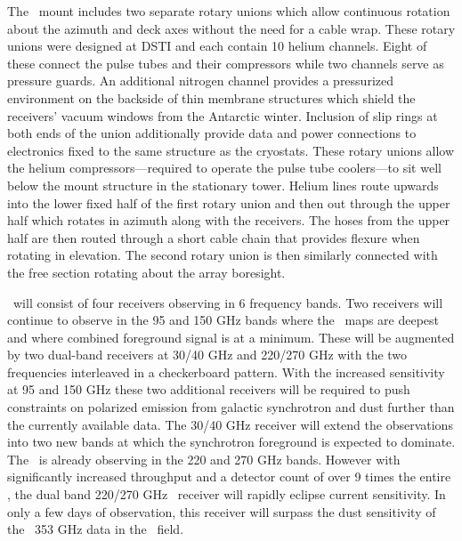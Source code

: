\documentclass[]{spie}  %
\begin{document}
The \biceparray\ mount includes two separate rotary unions which allow
continuous rotation about the azimuth and deck axes without the need for a
cable wrap. These rotary unions were designed at DSTI and each contain 10
helium channels. Eight of these connect the pulse tubes and their compressors
while two channels serve as pressure guards. An additional nitrogen channel
provides a pressurized environment on the backside of thin membrane
structures which shield the receivers' vacuum windows from the Antarctic winter.
Inclusion of slip rings at both ends of the union additionally provide data and power
connections to electronics fixed to the same structure as the cryostats. These rotary
unions allow the helium compressors---required to operate the
pulse tube coolers---to sit well below the mount structure in the
stationary tower. Helium lines route upwards into the lower fixed half of the first
rotary union and then out through the upper half which rotates in azimuth
along with the receivers. The hoses from the upper half are then routed through a
short cable chain that provides flexure when rotating in elevation. The
second rotary union is then similarly connected with the free section rotating
about the array boresight.



\biceparray\ will consist of four receivers observing in 6 frequency bands.
Two receivers will continue to observe in the 95 and 150 GHz bands where the
\bk\ maps are deepest and where combined foreground
signal is at a minimum. These will be augmented by two dual-band receivers at
30/40 GHz and 220/270 GHz with the two frequencies interleaved in a
checkerboard pattern. With the increased sensitivity at 95 and 150 GHz these
two additional receivers will be required to push constraints on polarized
emission from galactic synchrotron and dust further than the currently available data.
The 30/40 GHz receiver will extend the observations into two
new bands at which the synchrotron foreground is expected to dominate. The
\keckarray\ is already observing in the 220 and 270 GHz bands.  However with
significantly increased throughput and a detector count of over 9 times the
entire \keckarray, the dual band 220/270 GHz \biceparray\ receiver will rapidly
eclipse current sensitivity. In only a few days of observation,
this receiver will surpass the dust sensitivity of the \planck\ 353 GHz data in
the \bk\ field. 
\end{document}
